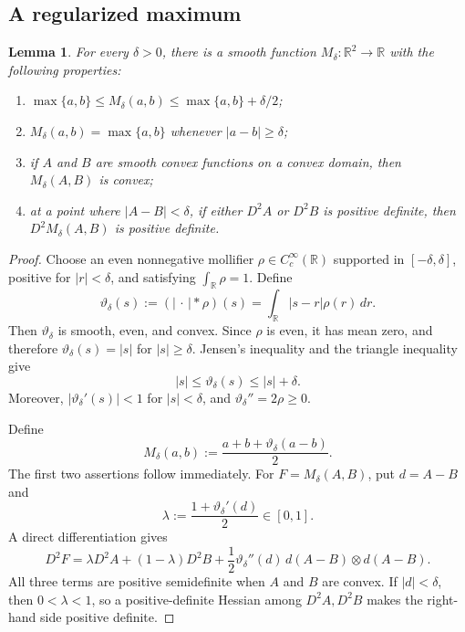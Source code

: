 \documentclass[11pt]{amsart}
\newtheorem{lemma}[theorem]{Lemma}
\theoremstyle{remark}
\newcommand{\R}{\mathbb R}
\begin{document}
\subsection{A regularized maximum}

\begin{lemma}\label{lem:regularized-max}
For every $\delta>0$, there is a smooth function
$M_\delta:\R^2\to\R$ with the following properties:
\begin{enumerate}[label=\textup{(\alph*)},leftmargin=2.2em]
 \item $\max\{a,b\}\leq M_\delta(a,b)\leq\max\{a,b\}+\delta/2$;
 \item $M_\delta(a,b)=\max\{a,b\}$ whenever $|a-b|\geq\delta$;
 \item if $A$ and $B$ are smooth convex functions on a convex domain, then $M_\delta(A,B)$ is convex;
 \item at a point where $|A-B|<\delta$, if either $D^2A$ or $D^2B$ is positive definite, then $D^2M_\delta(A,B)$ is positive definite.
\end{enumerate}
\end{lemma}

\begin{proof}
Choose an even nonnegative mollifier $\rho\in C_c^\infty(\R)$ supported in $[-\delta,\delta]$, positive for $|r|<\delta$, and satisfying $\int_\R\rho=1$.  Define
\[
 \vartheta_\delta(s):=(|\,\cdot\,|*\rho)(s)
 =\int_\R|s-r|\rho(r)\,dr.
\]
Then $\vartheta_\delta$ is smooth, even, and convex.  Since $\rho$ is even, it has mean zero, and therefore
$\vartheta_\delta(s)=|s|$ for $|s|\geq\delta$.  Jensen's inequality and the triangle inequality give
\[
 |s|\leq\vartheta_\delta(s)\leq|s|+\delta.
\]
Moreover, $|\vartheta_\delta'(s)|<1$ for $|s|<\delta$, and
$\vartheta_\delta''=2\rho\geq0$.

Define
\[
 M_\delta(a,b):=\frac{a+b+\vartheta_\delta(a-b)}2.
\]
The first two assertions follow immediately.  For $F=M_\delta(A,B)$, put
$d=A-B$ and
\[
 \lambda:=\frac{1+\vartheta_\delta'(d)}2\in[0,1].
\]
A direct differentiation gives
\begin{equation}\label{eq:hessian-regmax}
 D^2F
 =\lambda D^2A+(1-\lambda)D^2B
 +\frac12\vartheta_\delta''(d)\,d(A-B)\otimes d(A-B).
\end{equation}
All three terms are positive semidefinite when $A$ and $B$ are convex.  If $|d|<\delta$, then $0<\lambda<1$, so a positive-definite Hessian among $D^2A,D^2B$ makes the right-hand side positive definite.
\end{proof}
\end{document}
